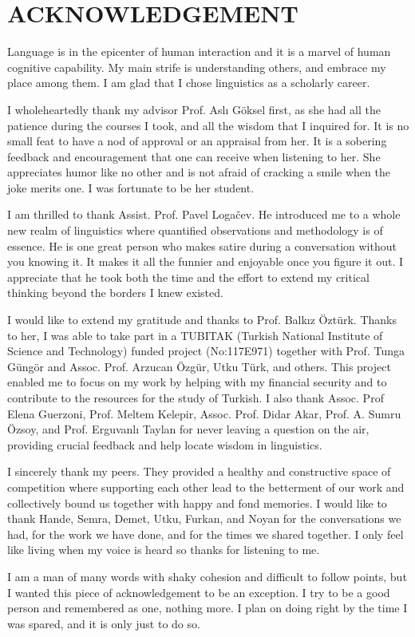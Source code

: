 \chapter*{\MakeUppercase{acknowledgement}}

Language is in the epicenter of human interaction and it is a marvel of human cognitive capability. My main strife is understanding others, and embrace my place among them. I am glad that I chose linguistics as a scholarly career. 

I wholeheartedly thank my advisor Prof. Aslı Göksel first, as she had all the patience during the courses I took, and all the wisdom that I inquired for. It is no small feat to have a nod of approval or an appraisal from her. It is a sobering feedback and encouragement that one can receive when listening to her. She appreciates humor like no other and is not afraid of cracking a smile when the joke merits one. I was fortunate to be her student. 

I am thrilled to thank Assist. Prof. Pavel Loga\v{c}ev. He introduced me to a whole new realm of linguistics where quantified observations and methodology is of essence. He is one great person who makes satire during a conversation without you knowing it. It makes it all the funnier and enjoyable once you figure it out. I appreciate that he took both the time and the effort to extend my critical thinking beyond the borders I knew existed.

I would like to extend my gratitude and thanks to Prof. Balkız Öztürk. Thanks to her, I was able to take part in a TUBITAK (Turkish National Institute of Science and Technology) funded project (No:117E971) together with Prof. Tunga Güngör and Assoc. Prof. Arzucan Özgür, Utku Türk, and others. This project enabled me to focus on my work by helping with my financial security and to contribute to the resources for the study of Turkish. I also thank Assoc. Prof Elena Guerzoni, Prof. Meltem Kelepir, Assoc. Prof. Didar Akar, Prof. A. Sumru Özsoy, and Prof. Erguvanlı Taylan for never leaving a question on the air, providing crucial feedback and help locate wisdom in linguistics.

I sincerely thank my peers. They provided a healthy and constructive space of competition where supporting each other lead to the betterment of our work and collectively bound us together with happy and fond memories. I would like to thank Hande, Semra, Demet, Utku, Furkan, and Noyan for the conversations we had, for the work we have done, and for the times we shared together. I only feel like living when my voice is heard so thanks for listening to me. 

I am a man of many words with shaky cohesion and difficult to follow points, but I wanted this piece of acknowledgement to be an exception. I try to be a good person and remembered as one, nothing more. I plan on doing right by the time I was spared, and it is only just to do so.
